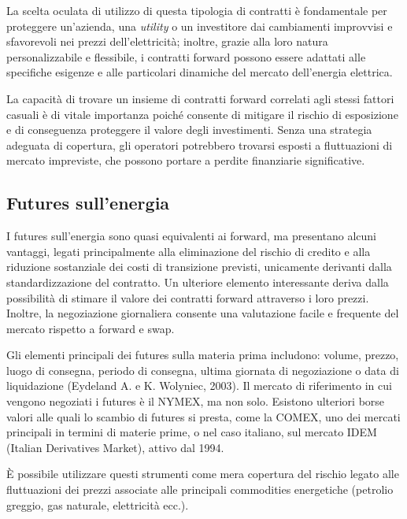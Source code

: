 \documentclass[12pt,a4paper]{report}
\begin{document}
La scelta oculata di utilizzo di questa tipologia di contratti è fondamentale per proteggere un'azienda, una \textit{utility} o un investitore dai cambiamenti improvvisi e sfavorevoli nei prezzi dell'elettricità; inoltre, grazie alla loro natura personalizzabile e flessibile, i contratti forward possono essere adattati alle specifiche esigenze e alle particolari dinamiche del mercato dell'energia elettrica.

La capacità di trovare un insieme di contratti forward correlati agli stessi fattori casuali è di vitale importanza poiché consente di mitigare il rischio di esposizione e di conseguenza proteggere il valore degli investimenti. Senza una strategia adeguata di copertura, gli operatori potrebbero trovarsi esposti a fluttuazioni di mercato impreviste, che possono portare a perdite finanziarie significative.


\subsection{Futures sull'energia}

I futures sull'energia sono quasi equivalenti ai forward, ma presentano alcuni vantaggi, legati principalmente alla eliminazione del rischio di credito e alla riduzione sostanziale dei costi di transizione previsti, unicamente derivanti dalla standardizzazione del contratto. Un ulteriore elemento interessante deriva dalla possibilità di stimare il valore dei contratti forward attraverso i loro prezzi. Inoltre, la negoziazione giornaliera consente una valutazione facile e frequente del mercato rispetto a forward e swap.

Gli elementi principali dei futures sulla materia prima includono: volume, prezzo, luogo di consegna, periodo di consegna, ultima giornata di negoziazione o data di liquidazione (Eydeland A. e K. Wolyniec, 2003). Il mercato di riferimento in cui vengono negoziati i futures è il NYMEX, ma non solo. Esistono ulteriori borse valori alle quali lo scambio di futures si presta, come la COMEX, uno dei mercati principali in termini di materie prime, o nel caso italiano, sul mercato IDEM (Italian Derivatives Market), attivo dal 1994.

È possibile utilizzare questi strumenti come mera copertura del rischio legato alle fluttuazioni dei prezzi associate alle principali commodities energetiche (petrolio greggio, gas naturale, elettricità ecc.).
\end{document}
